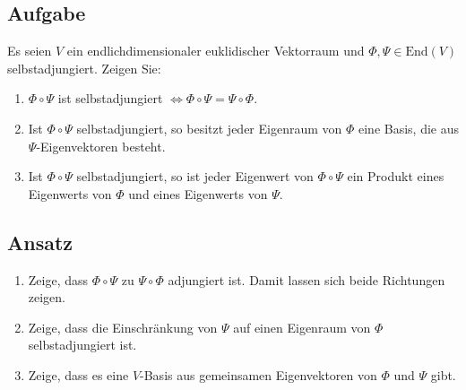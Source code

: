 \subsection{Aufgabe}
Es seien \( V \) ein endlichdimensionaler euklidischer Vektorraum und \( \Phi, \Psi \in \text{End}(V) \) selbstadjungiert. Zeigen Sie:
\begin{enumerate}
	\item \( \Phi \circ \Psi \) ist selbstadjungiert \( \Leftrightarrow \Phi \circ \Psi = \Psi \circ \Phi \).
	\item Ist \( \Phi \circ \Psi \) selbstadjungiert, so besitzt jeder Eigenraum von \( \Phi \) eine Basis, die aus \( \Psi \)-Eigenvektoren besteht.
	\item Ist \( \Phi \circ \Psi \) selbstadjungiert, so ist jeder Eigenwert von \( \Phi \circ \Psi \) ein Produkt eines Eigenwerts von \( \Phi \) und eines Eigenwerts von \( \Psi \).
\end{enumerate}

\subsection{Ansatz}
\begin{enumerate}
	\item Zeige, dass \( \Phi \circ \Psi \) zu \( \Psi \circ \Phi \) adjungiert ist. Damit lassen sich beide Richtungen zeigen.
	\item Zeige, dass die Einschränkung von \( \Psi \) auf einen Eigenraum von \( \Phi \) selbstadjungiert ist.
	\item Zeige, dass es eine \( V \)-Basis aus gemeinsamen Eigenvektoren von \( \Phi \) und \( \Psi \) gibt. 
\end{enumerate}

